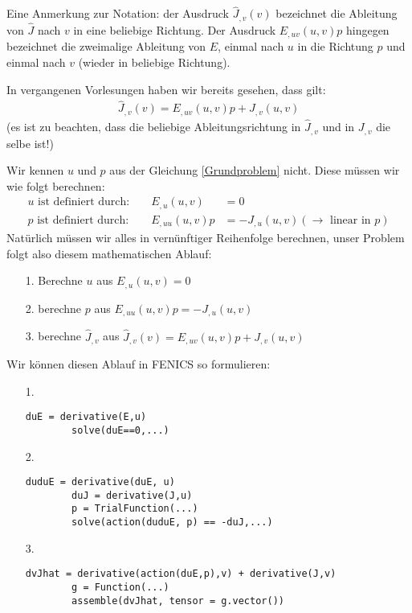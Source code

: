 \documentclass[a4paper, 12pt]{scrartcl}
\newcommand{\Jhat}{\widehat{J}}
\begin{document}
	Eine Anmerkung zur Notation: der Ausdruck $\Jhat_{,v}(v)$ bezeichnet die Ableitung von $\Jhat$ nach $v$ in eine beliebige Richtung. Der Ausdruck $E_{,uv}(u,v)p$ hingegen bezeichnet die zweimalige Ableitung von $E$, einmal nach $u$ in die Richtung $p$ und einmal nach $v$ (wieder in beliebige Richtung).
	
	In vergangenen Vorlesungen haben wir bereits gesehen, dass gilt:
	\begin{gather}
		\Jhat_{,v}(v) = E_{,uv}(u,v)p+ J_{,v}(u,v)
		\label{Grundproblem}
	\end{gather}
	(es ist zu beachten, dass die beliebige Ableitungsrichtung in $\Jhat_{,v}$ und in $J_{,v}$ die selbe ist!)
	
	Wir kennen $u$ und $p$ aus der Gleichung \ref{Grundproblem} nicht. Diese müssen wir wie folgt berechnen:
	\begin{align*}
		u \text{ ist definiert durch: }&&E_{,u}(u,v)&=0
		\\
		p \text{ ist definiert durch: }&&E_{,uu}(u,v)p&=-J_{,u}(u,v) (\rightarrow \text{ linear in }p)
	\end{align*}
	Natürlich müssen wir alles in vernünftiger Reihenfolge berechnen, unser Problem folgt also diesem mathematischen Ablauf:
	\begin{itemize}
		\item [1.] Berechne $u$ aus $E_{,u}(u,v)=0$
		\item [2.] berechne $p$ aus $E_{,uu}(u,v)p=-J_{,u}(u,v)$
		\item [3.] berechne $\Jhat_{,v}$ aus $\Jhat_{,v}(v) = E_{,uv}(u,v)p+ J_{,v}(u,v)$
	\end{itemize}
	Wir können diesen Ablauf in FENICS so formulieren:
	\begin{itemize}
		\item [1.] \begin{verbatim}duE = derivative(E,u)
		solve(duE==0,...) \end{verbatim}
		\item [2.] \begin{verbatim}duduE = derivative(duE, u)
		duJ = derivative(J,u)
		p = TrialFunction(...)
		solve(action(duduE, p) == -duJ,...) \end{verbatim}
		\item [3.] \begin{verbatim}dvJhat = derivative(action(duE,p),v) + derivative(J,v)
		g = Function(...)
		assemble(dvJhat, tensor = g.vector())\end{verbatim}
	\end{itemize}
\end{document}
